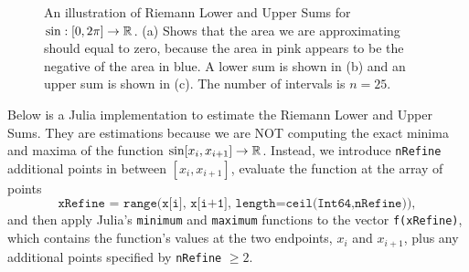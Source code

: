    \begin{figure}[htb]%
\centering
{}%
\hspace{5pt}%
%
	\centering
{}%
    \caption[]{An illustration of Riemann Lower and Upper Sums for $\sin:[0, 2 \pi] \to \mathbb R$. (a) Shows that the area we are approximating should equal to zero, because the area in pink appears to be the negative of the area in blue. A lower sum is shown in (b) and an upper sum is shown in (c). The number of intervals is $n=25$.}
    \label{fig:RiemannLowerUpperSums4sine}
\end{figure}

Below is a Julia implementation to estimate the Riemann Lower and Upper Sums. They are estimations because we are NOT computing the exact minima and maxima of the function $\sin[x_i, x_{i+1}] \to \mathbb R$. Instead, we introduce \texttt{nRefine} additional points in between $[x_i, x_{i+1}]$, evaluate the function at the array of points 
$$\texttt{xRefine = range(x[i], x[i+1], length=ceil(Int64,nRefine))},$$
and then apply Julia's \texttt{minimum} and \texttt{maximum} functions to the vector \texttt{f(xRefine)}, which contains the function's values at the two endpoints, $x_i$ and $x_{i+1}$, plus any additional points specified by \texttt{nRefine} $\ge 2$. \\

\begin{center}
\setlength{\fboxrule}{2pt}  %
\end{center}


